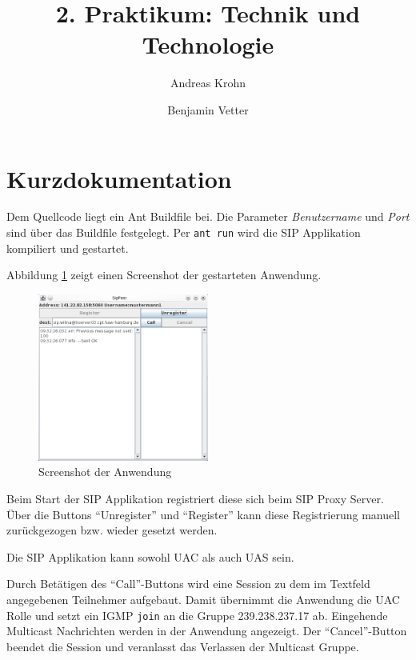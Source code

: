 \documentclass[a4paper,10pt]{article}
\title{2. Praktikum: Technik und Technologie}
\author{Andreas Krohn \and Benjamin Vetter}
\begin{document}
\maketitle

\section{Kurzdokumentation}

Dem Quellcode liegt ein Ant Buildfile bei. 
Die Parameter \emph{Benutzername} und \emph{Port} sind über das Buildfile festgelegt.
Per \verb=ant run= wird die SIP Applikation kompiliert und gestartet.

Abbildung \ref{screenshot} zeigt einen Screenshot der gestarteten Anwendung. 

\begin{figure}[h]
	\begin{center}
		\includegraphics[width=0.5\textwidth]{screenshot_SipPeer.png}
	\end{center}

	\caption{Screenshot der Anwendung}

	\label{screenshot}
\end{figure}


Beim Start der SIP Applikation registriert diese sich beim SIP Proxy Server. Über die Buttons "`Unregister"' und "`Register"' kann diese Registrierung manuell zurückgezogen bzw. wieder gesetzt werden.

Die SIP Applikation kann sowohl UAC als auch UAS sein. 

Durch Betätigen des "`Call"'-Buttons wird eine Session zu dem im Textfeld angegebenen Teilnehmer aufgebaut. Damit übernimmt die Anwendung die UAC Rolle und setzt ein IGMP \verb=join= an die Gruppe 239.238.237.17 ab. Eingehende Multicast Nachrichten werden in der Anwendung angezeigt. Der "`Cancel"'-Button beendet die Session und veranlasst das Verlassen der Multicast Gruppe.
\end{document}
